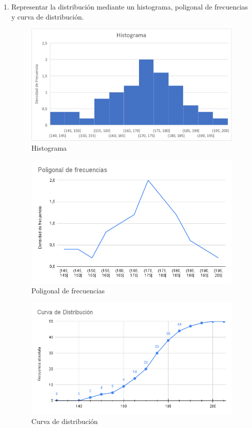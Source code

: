 \begin{ejercicio}
\begin{enumerate}
        \item Representar la distribución mediante un histograma, poligonal de frecuencias y curva de distribución.
        \begin{figure}[H]
            \centering
            \includegraphics[width=0.7\linewidth]{Imagenes/Histograma_Ej2.png}
            \caption{Histograma}
        \end{figure}
        \begin{figure}[H]
            \centering
            \includegraphics[width=0.7\linewidth]{Imagenes/Poligonal_frec_Ej2.png}
            \caption{Poligonal de frecuencias}
        \end{figure}
        \begin{figure}[H]
            \centering
            \includegraphics[width=\linewidth]{Imagenes/Curva_Ej2.png}
            \caption{Curva de distribución}
        \end{figure}
    \end{enumerate}
\end{ejercicio}

